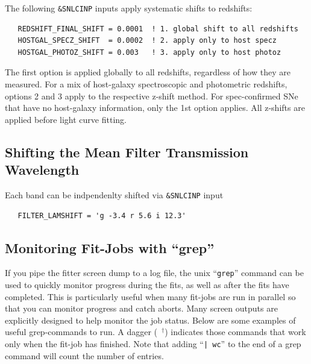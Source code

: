 \documentclass[12pt]{article}
\newcommand{\jobend}{\mbox{~$^\dagger$}}
\begin{document}
The following {\tt \&SNLCINP} inputs apply systematic shifts to redshifts:
%
\begin{verbatim}
   REDSHIFT_FINAL_SHIFT = 0.0001  ! 1. global shift to all redshifts
   HOSTGAL_SPECZ_SHIFT  = 0.0002  ! 2. apply only to host specz
   HOSTGAL_PHOTOZ_SHIFT = 0.003   ! 3. apply only to host photoz
\end{verbatim}
%
The first option is applied globally to all redshifts, regardless
of how they are measured.
For a mix of host-galaxy spectroscopic and photometric redshifts,
options 2 and 3 apply to the respective z-shift method.
For spec-confirmed SNe that have no host-galaxy information,
only the 1st option applies.
All z-shifts are applied before light curve fitting.


   \subsection{Shifting the Mean Filter Transmission Wavelength}
   \label{subsec:lamshift}

Each band can be indpendenlty shifted via {\tt \&SNLCINP} input
%
\begin{verbatim}
   FILTER_LAMSHIFT = 'g -3.4 r 5.6 i 12.3'
\end{verbatim}

   \subsection{Monitoring Fit-Jobs with ``grep'' }
   \label{subsec:grep}

If you pipe the fitter screen dump to a log file,
the unix ``{\tt grep}'' command can be used
to quickly monitor progress during the fits, as well
as after the fits have completed. This is particularly
useful when many fit-jobs are run in parallel
so that you can monitor progress and catch aborts.
Many screen outputs are explicitly designed 
to help monitor the job status. Below are some 
examples of useful grep-commands to run.
A dagger ({\jobend}) indicates those commands
that work only when the fit-job has finished. 
Note that adding  ``{\tt | wc}'' to the end of
a grep command will count the number of entries.
\end{document}
